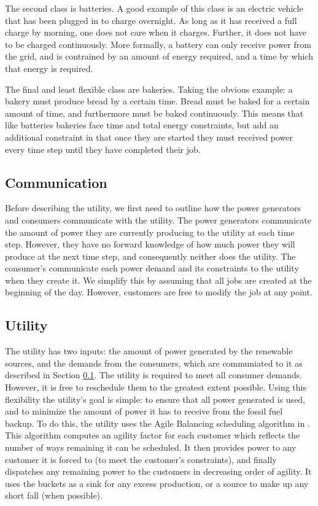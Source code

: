 \documentclass[conference]{IEEEtran}
\begin{document}
The second class is batteries. A good example of this class is an electric vehicle that has been plugged in to charge overnight. As long as it has received a full charge by morning, one does not care when it charges. Further, it does not have to be charged continuously. More formally, a battery can only receive power from the grid, and is contrained by an amount of energy required, and a time by which that energy is required.

The final and least flexible class are bakeries. Taking the obvious example: a bakery must produce bread by a certain time. Bread must be baked for a certain amount of time, and furthermore must be baked continuously. This means that like batteries bakeries face time and total energy constraints, but add an additional constraint in that once they are started they must received power every time step until they have completed their job.

\subsection{Communication}
\label{Communication}

Before describing the utility, we first need to outline how the power generators and consumers communicate with the utility. The power generators communicate the amount of power they are currently producing to the utility at each time step. However, they have no forward knowledge of how much power they will produce at the next time step, and consequently neither does the utility. The consumer's communicate each power demand and its constraints to the utility when they create it. We simplify this by assuming that all jobs are created at the beginning of the day. However, customers are free to modify the job at any point.

\subsection{Utility}
\label{Utility}

The utility has two inputs: the amount of power generated by the renewable sources, and the demands from the consumers, which are communiated to it as described in Section \ref{Communication}. The utility is required to meet all consumer demands. However, it is free to reschedule them to the greatest extent possible. Using this flexibility the utility's goal is simple: to ensure that all power generated is used, and to minimize the amount of power it has to receive from the fossil fuel backup. To do this, the utility uses the Agile Balancing scheduling algorithm in \cite{petersen2013taxonomy}. This algorithm computes an agility factor for each customer which reflects the number of ways remaining it can be scheduled.  It then provides power to any customer it is forced to (to meet the customer's constraints), and finally dispatches any remaining power to the customers in decreasing order of agility.  It uses the buckets as a sink for any excess production, or a source to make up any short fall (when possible).
\end{document}
